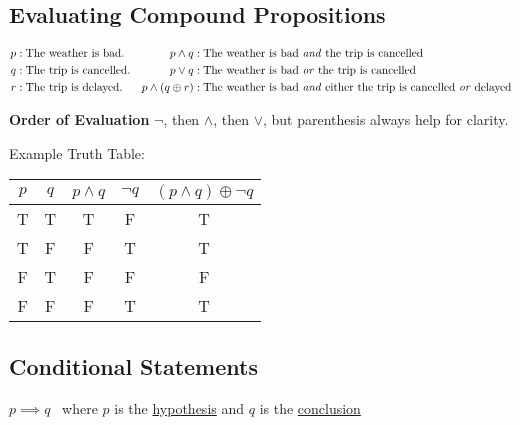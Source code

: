 \subsection{Evaluating Compound Propositions}

\begin{align*}
  p & : \text{The weather is bad.}    & p \land q            & : \text{The weather is bad \textit{and} the trip is cancelled}                            \\
  q & : \text{The trip is cancelled.} & p \lor q             & : \text{The weather is bad \textit{or} the trip is cancelled}                             \\
  r & : \text{The trip is delayed.}   & p \land (q \oplus r) & : \text{The weather is bad \textit{and} either the trip is cancelled \textit{or} delayed} \\
\end{align*}

\textbf{Order of Evaluation} $\lnot$, then $\land$, then $\lor$, but parenthesis always help for clarity.

\begin{center}
  Example Truth Table:
  \qquad
  \begin{tabular}{c|c|c|c|c}
    $p$ & $q$ & $p \land q$ & $\lnot q$ & $(p \land q) \oplus \lnot q$ \\
    \hline
    T   & T   & T           & F         & T                            \\
    T   & F   & F           & T         & T                            \\
    F   & T   & F           & F         & F                            \\
    F   & F   & F           & T         & T                            \\
  \end{tabular}
\end{center}

\subsection{Conditional Statements}

\begin{center}
  $p \implies q$ \ where $p$ is the \underline{hypothesis} and $q$ is the \underline{conclusion}
\end{center}

